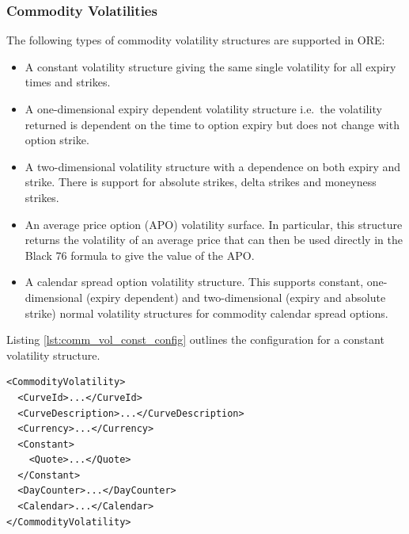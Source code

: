 \subsubsection{Commodity Volatilities}

The following types of commodity volatility structures are supported in ORE:
\begin{itemize}
\item A constant volatility structure giving the same single volatility for all expiry times and strikes.
\item A one-dimensional expiry dependent volatility structure i.e.\ the volatility returned is dependent on the time to option expiry but does not change with option strike.
\item A two-dimensional volatility structure with a dependence on both expiry and strike. There is support for absolute strikes, delta strikes and moneyness strikes.
\item An average price option (APO) volatility surface. In particular, this structure returns the volatility of an average price that can then be used directly in the Black 76 formula to give the value of the APO.
\item A calendar spread option volatility structure. This supports constant, one-dimensional (expiry dependent) and two-dimensional (expiry and absolute strike) normal volatility structures for commodity calendar spread options.
\end{itemize}

Listing \ref{lst:comm_vol_const_config} outlines the configuration for a constant volatility structure.

\begin{longlisting}
\begin{verbatim}
<CommodityVolatility>
  <CurveId>...</CurveId>
  <CurveDescription>...</CurveDescription>
  <Currency>...</Currency>
  <Constant>
    <Quote>...</Quote>
  </Constant>
  <DayCounter>...</DayCounter>
  <Calendar>...</Calendar>
</CommodityVolatility>
\end{verbatim}
\caption{Constant commodity volatility configuration}
\label{lst:comm_vol_const_config}
\end{longlisting}


